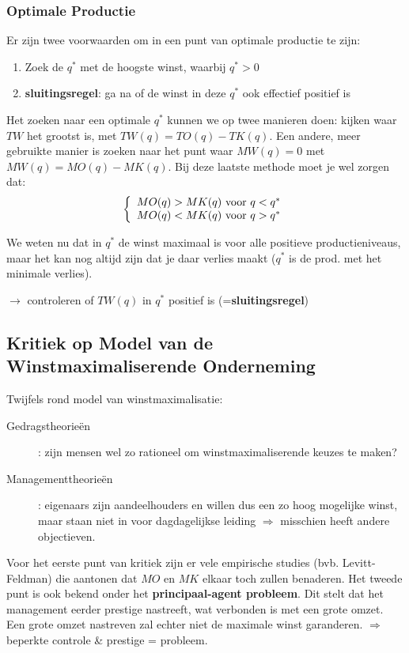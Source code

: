 \subsubsection{Optimale Productie}
Er zijn twee voorwaarden om in een punt van optimale productie te zijn:
\begin{enumerate}
	\item Zoek de $q^*$ met de hoogste winst, waarbij $q^* > 0$
    \item \textbf{sluitingsregel}: ga na of de winst in deze $q^*$ ook effectief positief is
\end{enumerate}

Het zoeken naar een optimale $q^*$ kunnen we op twee manieren doen: kijken waar $TW$ het grootst is, met $ TW(q) = TO(q) - TK(q)$. Een andere, meer gebruikte manier is zoeken naar het punt waar $MW(q) = 0$ met $MW(q) = MO(q) - MK(q)$. Bij deze laatste methode moet je wel zorgen dat:
\begin{equation}
	\left \{\begin{array}{l l}
    MO(q) > MK(q) \text{ voor } q < q^*\\
    MO(q) < MK(q) \text{ voor } q > q^*
  \end{array} \right.
\end{equation}

We weten nu dat in $q^*$ de winst maximaal is voor alle positieve productieniveaus, maar het kan nog altijd zijn dat je daar verlies maakt ($q^*$ is de prod. met het minimale verlies).

$\rightarrow$ controleren of $TW(q)$ in $q^*$ positief is (=\textbf{sluitingsregel})

\subsection{Kritiek op Model van de Winstmaximaliserende Onderneming}
Twijfels rond model van winstmaximalisatie:
\begin{description}
	\item[Gedragstheorie\"en]: zijn mensen wel zo rationeel om winstmaximaliserende keuzes te maken?
	\item[Managementtheorie\"en]: eigenaars zijn aandeelhouders en willen dus een zo hoog mogelijke winst, maar staan niet in voor dagdagelijkse leiding $\Rightarrow$ misschien heeft andere objectieven.
\end{description}

Voor het eerste punt van kritiek zijn er vele empirische studies (bvb. Levitt-Feldman) die aantonen dat $MO$ en $MK$ elkaar toch zullen benaderen. Het tweede punt is ook bekend onder het \textbf{principaal-agent probleem}. Dit stelt dat het management eerder prestige nastreeft, wat verbonden is met een grote omzet. Een grote omzet nastreven zal echter niet de maximale winst garanderen. $\Rightarrow$ beperkte controle \& prestige = probleem.

